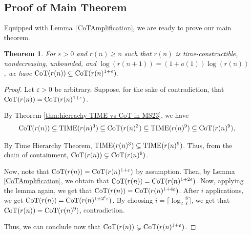 \documentclass{article}
\let\epsilon\varepsilon
\newtheorem{theorem}{Theorem}[section]
\theoremstyle{definition}
\newcommand{\0}{\mathbf{0}}
\newcommand{\CoT}{\mbox{\rm CoT}}
\newcommand{\1}{\mathbbm{1}}
\newcommand{\TIME}{\mbox{\rm TIME}}
\begin{document}
\subsection{Proof of Main Theorem}

Equipped with Lemma~\ref{CoTAmplification}, we are ready to prove our main theorem. 

\begin{theorem} \label{thm:main theorem}
For $\epsilon > 0$ and $r(n) \geq n$ such that $r(n)$ is time-constructible, nondecreasing, unbounded, and $\log(r(n+1)) = (1+o(1)) \log(r(n))$, we have $\CoT(r(n)) \subsetneq \CoT(r(n)^{1+\epsilon}).$ 
\end{theorem}

\begin{proof}
    Let $\epsilon > 0$ be arbitrary. Suppose, for the sake of contradiction, that $\CoT(r(n)) = \CoT(r(n)^{1+\epsilon})$.
    
    By Theorem \ref{thm:hierrachy TIME vs CoT in MS23}, we have
    \begin{align*}
        \CoT(r(n)) \subseteq \TIME(r(n)^3) \subseteq \CoT(r(n)^3) \subseteq \TIME(r(n)^9) \subseteq \CoT(r(n)^9),
    \end{align*}

By Time Hierarchy Theorem, $\TIME(r(n)^3)\subsetneq \TIME(r(n)^9)$. Thus, from the chain of containment,
$\CoT(r(n)) \subsetneq \CoT(r(n)^9)$. 

    Now, note that $\CoT(r(n)) = \CoT(r(n)^{1 + \epsilon})$ by assumption. Then, by Lemma \ref{CoTAmplification}, we obtain that $\CoT(r(n)) = \CoT(r(n)^{1 + 2\epsilon})$. Now, applying the lemma again, we get that $\CoT(r(n)) = \CoT(r(n)^{1 + 4\epsilon})$. After $i$ applications, we get $\CoT(r(n)) = \CoT(r(n)^{1 +2^i \epsilon})$. By choosing $i=\lceil \log_2 {\frac{8}{\epsilon}}\rceil$, we get that $\CoT(r(n)) = \CoT(r(n)^{9})$, contradiction. 

    Thus, we can conclude now that $\CoT(r(n)) \subsetneq \CoT(r(n)^{1 + \epsilon})$. 
\end{proof}





\printbibliography

\appendix

\end{document}
